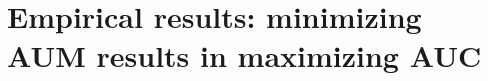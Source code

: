 \documentclass[t]{beamer}
\begin{document}
\section{Empirical results: minimizing AUM results in maximizing AUC} 






    

\end{document}
